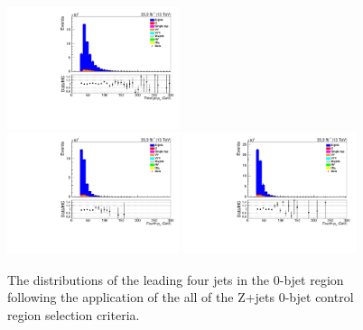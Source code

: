 \begin{figure}[!ht]
\includegraphics[width=0.45\textwidth]{figs/background-estimation/plots/unblinded/DY_control_old_prompt_mumu_DYamcatnlo/thirdJetPt_SingleTop_wMass_mumu.pdf}
\\
\includegraphics[width=0.45\textwidth]{figs/background-estimation/plots/unblinded/DY_control_old_prompt_ee_DYamcatnlo/fourthJetPt_SingleTop_wMass_ee.pdf}
\includegraphics[width=0.45\textwidth]{figs/background-estimation/plots/unblinded/DY_control_old_prompt_mumu_DYamcatnlo/fourthJetPt_SingleTop_wMass_mumu.pdf}
\caption{
The distributions of the leading four jets \pt in the 0-bjet region following the application of the all of the Z+jets 0-bjet control region selection criteria.
}
\label{fig:CR_NLO_jetPt_wMass}
\end{figure}

